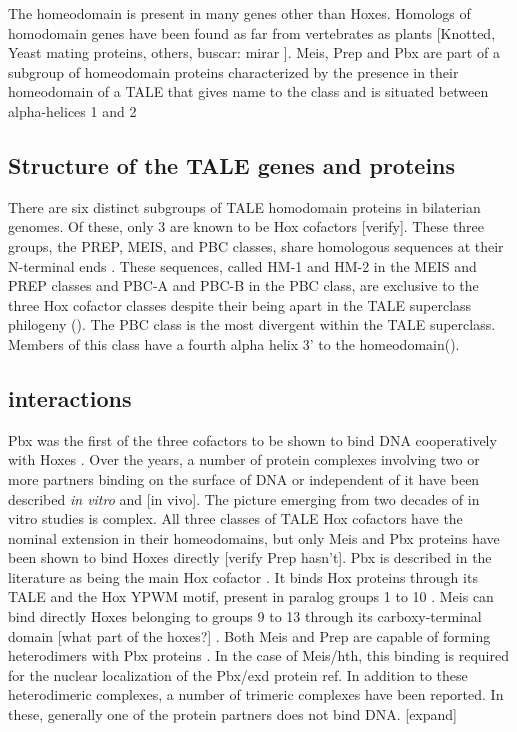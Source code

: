 The homeodomain is present in many genes other than Hoxes. Homologs of homodomain genes have been found as far from vertebrates as plants [Knotted, Yeast mating proteins, others, buscar: mirar \cite{Burglin1997}]. Meis, Prep and Pbx are part of a subgroup of homeodomain proteins characterized by the presence in their homeodomain of a \ac{TALE} that gives name to the class and is situated between alpha-helices 1 and 2 \cite{Bertolino1995, Burglin1997, Mukherjee2007, Moens2006}

\subsection{Structure of the TALE genes and proteins}
	
		There are six distinct subgroups of \ac{TALE} homodomain proteins in bilaterian genomes. Of these, only 3 are known to be Hox cofactors [verify]. These three groups, the PREP, MEIS, and PBC classes, share homologous sequences at their N-terminal ends \cite{Burglin1998}. These sequences, called HM-1 and HM-2 in the MEIS and PREP classes and PBC-A and PBC-B in the PBC class, are exclusive to the three Hox cofactor classes despite their being apart in the \ac{TALE} superclass philogeny (\cite{Mukherjee2007}).
		The PBC class is the most divergent within the \ac{TALE} superclass. Members of this class have a fourth alpha helix 3' to the homeodomain(\cite{Mukherjee2007}). 

\subsection{interactions}

		Pbx was the first of the three cofactors to be shown to bind DNA cooperatively with Hoxes \cite{ref}. Over the years, a number of protein complexes involving two or more partners binding on the surface of DNA or independent of it have been described \textit{in vitro} and [in vivo]. The picture emerging from two decades of in vitro studies is complex. 
		All three classes of \ac{TALE} Hox cofactors have the nominal extension in their homeodomains, but only Meis and Pbx proteins have been shown to bind Hoxes directly [verify Prep hasn't]. Pbx is described in the literature as being the main Hox cofactor \cite{ref}. It binds Hox proteins through its \ac{TALE} and the Hox YPWM motif, present in paralog groups 1 to 10 \cite{refs, Passner1999}. Meis can bind directly Hoxes belonging to groups 9 to 13 through its carboxy-terminal domain [what part of the hoxes?] \cite{ref}. 
		Both Meis and Prep are capable of forming heterodimers with Pbx proteins \cite{ref}. In the case of Meis/\ac{hth}, this binding is required for the nuclear localization of the Pbx/\ac{exd} protein {ref}. 
		In addition to these heterodimeric complexes, a number of trimeric complexes have been reported. In these, generally one of the protein partners does not bind DNA. [expand]

